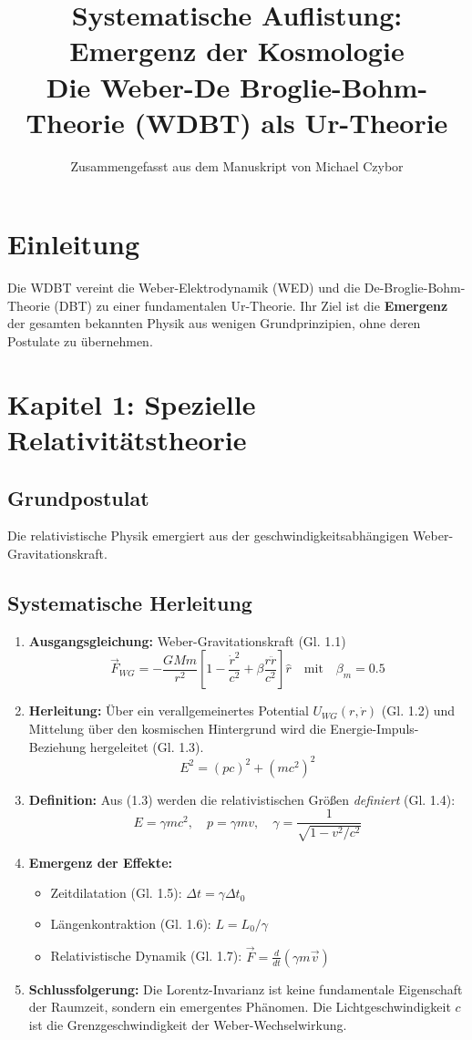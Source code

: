 \documentclass[10pt,a4paper]{article}
\title{Systematische Auflistung: Emergenz der Kosmologie \\ Die Weber-De Broglie-Bohm-Theorie (WDBT) als Ur-Theorie}
\author{Zusammengefasst aus dem Manuskript von Michael Czybor}
\date{}
\begin{document}
\maketitle

\section*{Einleitung}
Die WDBT vereint die Weber-Elektrodynamik (WED) und die De-Broglie-Bohm-Theorie (DBT) zu einer fundamentalen Ur-Theorie. Ihr Ziel ist die \textbf{Emergenz} der gesamten bekannten Physik aus wenigen Grundprinzipien, ohne deren Postulate zu übernehmen.

\section{Kapitel 1: Spezielle Relativitätstheorie}

\subsection*{Grundpostulat}
Die relativistische Physik emergiert aus der geschwindigkeitsabhängigen Weber-Gravitationskraft.

\subsection*{Systematische Herleitung}
\begin{enumerate}
    \item \textbf{Ausgangsgleichung:} Weber-Gravitationskraft (Gl. 1.1)
        \[
        \vec{F}_{WG} = -\frac{GMm}{r^2} \left[ 1 - \frac{\dot{r}^2}{c^2} + \beta \frac{r\ddot{r}}{c^2} \right] \hat{r} \quad \text{mit} \quad \beta_m = 0.5
        \]
    \item \textbf{Herleitung:} Über ein verallgemeinertes Potential $U_{WG}(r, \dot{r})$ (Gl. 1.2) und Mittelung über den kosmischen Hintergrund wird die Energie-Impuls-Beziehung hergeleitet (Gl. 1.3).
        \[
        E^2 = (pc)^2 + (mc^2)^2
        \]
    \item \textbf{Definition:} Aus (1.3) werden die relativistischen Größen \textit{definiert} (Gl. 1.4):
        \[
        E = \gamma m c^2, \quad p = \gamma m v, \quad \gamma = \frac{1}{\sqrt{1 - v^2/c^2}}
        \]
    \item \textbf{Emergenz der Effekte:}
        \begin{itemize}
            \item Zeitdilatation (Gl. 1.5): $\Delta t = \gamma \Delta t_0$
            \item Längenkontraktion (Gl. 1.6): $L = L_0 / \gamma$
            \item Relativistische Dynamik (Gl. 1.7): $\vec{F} = \frac{d}{dt}(\gamma m \vec{v})$
        \end{itemize}
    \item \textbf{Schlussfolgerung:} Die Lorentz-Invarianz ist keine fundamentale Eigenschaft der Raumzeit, sondern ein emergentes Phänomen. Die Lichtgeschwindigkeit $c$ ist die Grenzgeschwindigkeit der Weber-Wechselwirkung.
\end{enumerate}
\end{document}
